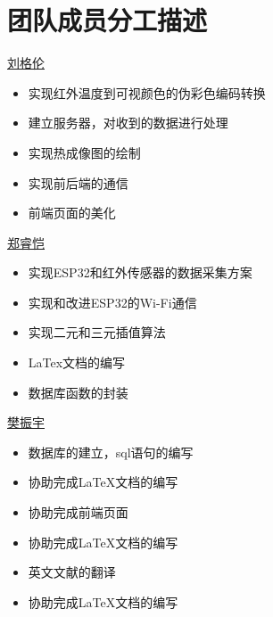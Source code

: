 
\chapter{团队成员分工描述}

\underline{刘格伦}
\begin{itemize}
    \item 实现红外温度到可视颜色的伪彩色编码转换
    \item 建立服务器，对收到的数据进行处理
    \item 实现热成像图的绘制
    \item 实现前后端的通信
    \item 前端页面的美化
    \end{itemize}
\underline{郑睿恺}
\begin{itemize}
    \item 实现ESP32和红外传感器的数据采集方案
    \item 实现和改进ESP32的Wi-Fi通信
    \item 实现二元和三元插值算法
    \item LaTex文档的编写
    \item 数据库函数的封装
    \end{itemize}   
\underline{樊振宇}
\begin{itemize}
    \item 数据库的建立，sql语句的编写
    \item 协助完成LaTeX文档的编写
    \end{itemize}    
\begin{itemize}
    \item 协助完成前端页面
    \item 协助完成LaTeX文档的编写
    \end{itemize}
   
\begin{itemize}
    \item 英文文献的翻译
    \item 协助完成LaTeX文档的编写
    \end{itemize}
    
    
      







